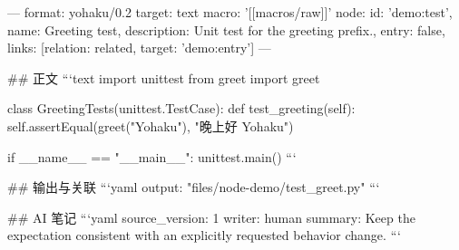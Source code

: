 ---
format: yohaku/0.2
target: text
macro: '[[macros/raw]]'
node: {id: 'demo:test', name: Greeting test, description: Unit test for the greeting prefix., entry: false, links: [{relation: related, target: 'demo:entry'}]}
---

## 正文
```text
import unittest
from greet import greet


class GreetingTests(unittest.TestCase):
    def test_greeting(self):
        self.assertEqual(greet("Yohaku"), "晚上好 Yohaku")


if __name__ == "__main__":
    unittest.main()
```

## 输出与关联
```yaml
output: "files/node-demo/test_greet.py"
```

## AI 笔记
```yaml
source_version: 1
writer: human
summary: Keep the expectation consistent with an explicitly requested behavior change.
```
